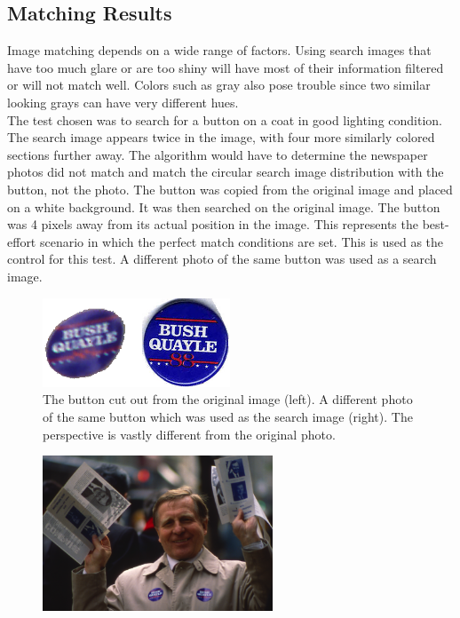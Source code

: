 \documentclass[10pt, journal]{vgtc}                %
\newcommand\tab[1][1cm]{\hspace*{#1}}
\begin{document}
\subsection{Matching Results}
\begin{flushleft}
	\tab Image matching depends on a wide range of factors. Using search images that have too much glare or are too shiny will have most of their information filtered or will not match well. Colors such as gray also pose trouble since two similar looking grays can have very different hues. \\\smallskip
	\tab The test chosen was to search for a button on a coat in good lighting condition. The search image appears twice in the image, with four more similarly colored sections further away. The algorithm would have to determine the newspaper photos did not match and match the circular search image distribution with the button, not the photo. The button was copied from the original image and placed on a white background. It was then searched on the original image. The button was 4 pixels away from its actual position in the image. This represents the best-effort scenario in which the perfect match conditions are set. This is used as the control for this test. A different photo of the same button was used as a search image.\\
	\begin{figure}[h!]
		\centering
		\includegraphics[width=2.2in]{button.png}
		\caption{The button cut out from the original image (left). A different photo of the same button which was used as the search image (right). The perspective is vastly different from the original photo.}
	\end{figure}
	\begin{figure}[h!]
		\centering
		\includegraphics[width=2.7in]{eight.png}

\end{figure}
\end{flushleft}
\end{document}
